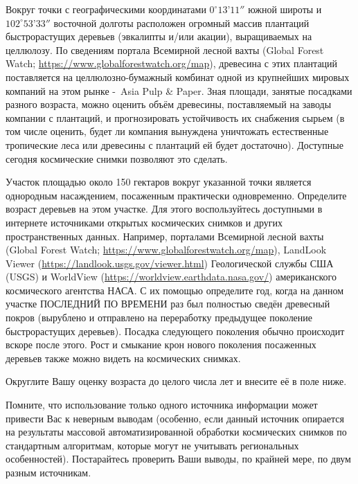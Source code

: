 
Вокруг точки с географическими координатами $0^{\circ}13’11''$ южной широты и $102^{\circ}53’33''$
восточной долготы расположен огромный массив плантаций быстрорастущих деревьев (эвкалипты и/или акации), выращиваемых на целлюлозу. 
По сведениям портала Всемирной лесной вахты (Global Forest Watch; \url{https://www.globalforestwatch.org/map}), древесина с этих плантаций поставляется на 
целлюлозно-бумажный комбинат одной из крупнейших мировых компаний на этом рынке - Asia Pulp \& Paper. 
Зная площади, занятые посадками разного возраста, можно оценить объём древесины, поставляемый на 
заводы компании с плантаций, и прогнозировать устойчивость их снабжения сырьем (в том числе оценить, 
будет ли компания вынуждена уничтожать естественные тропические леса или древесины с плантаций ей будет достаточно). 
Доступные сегодня космические снимки позволяют это сделать.

Участок площадью около 150 гектаров вокруг указанной точки является однородным насаждением, 
посаженным практически одновременно. Определите возраст деревьев на этом участке. 
Для этого воспользуйтесь доступными в интернете источниками открытых космических снимков и других 
пространственных данных. Например, порталами Всемирной лесной вахты (Global Forest Watch; \url{https://www.globalforestwatch.org/map}), 
LandLook Viewer (\url{https://landlook.usgs.gov/viewer.html}) Геологической службы США (USGS) и WorldView (\url{https://worldview.earthdata.nasa.gov/}) американского космического агентства НАСА. 
С их помощью определите год, когда на данном участке ПОСЛЕДНИЙ ПО ВРЕМЕНИ раз был полностью сведён древесный покров 
(вырублено и отправлено на переработку предыдущее поколение быстрорастущих деревьев). 
Посадка следующего поколения обычно происходит вскоре после этого. Рост и смыкание крон нового поколения посаженных 
деревьев также можно видеть на космических снимках.

Округлите Вашу оценку возраста до целого числа лет и внесите её в поле ниже.

Помните, что использование только одного источника информации может привести Вас к неверным выводам 
(особенно, если данный источник опирается на результаты массовой автоматизированной обработки 
космических снимков по стандартным алгоритмам, которые могут не учитывать региональных особенностей). 
Постарайтесь проверить Ваши выводы, по крайней мере, по двум разным источникам.

\soultionSection

